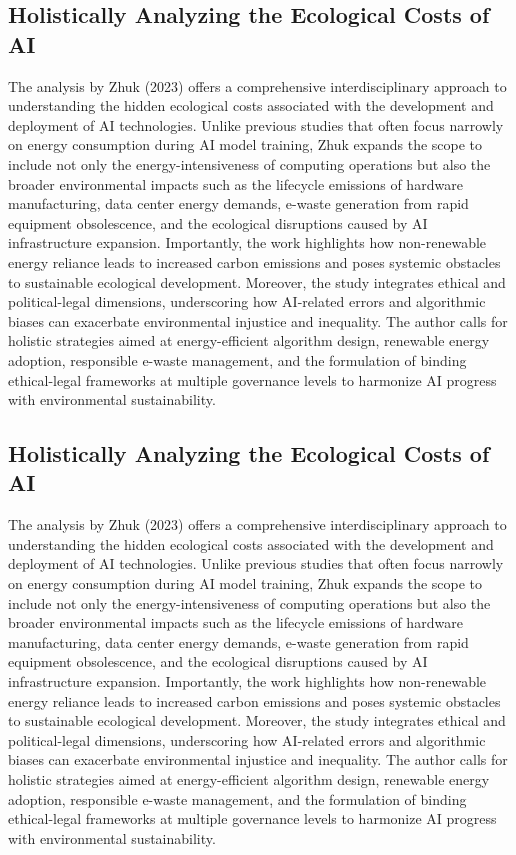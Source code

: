 \documentclass[a4paper, 12pt]{article}
\begin{document}
\subsection{Holistically Analyzing the Ecological Costs of AI}
\hspace{24pt}The analysis by Zhuk (2023) offers a comprehensive interdisciplinary approach to understanding the hidden ecological costs associated with the development and deployment of AI technologies. Unlike previous studies that often focus narrowly on energy consumption during AI model training, Zhuk expands the scope to include not only the energy-intensiveness of computing operations but also the broader environmental impacts such as the lifecycle emissions of hardware manufacturing, data center energy demands, e-waste generation from rapid equipment obsolescence, and the ecological disruptions caused by AI infrastructure expansion. Importantly, the work highlights how non-renewable energy reliance leads to increased carbon emissions and poses systemic obstacles to sustainable ecological development. Moreover, the study integrates ethical and political-legal dimensions, underscoring how AI-related errors and algorithmic biases can exacerbate environmental injustice and inequality. The author calls for holistic strategies aimed at energy-efficient algorithm design, renewable energy adoption, responsible e-waste management, and the formulation of binding ethical-legal frameworks at multiple governance levels to harmonize AI progress with environmental sustainability.

\subsection{Holistically Analyzing the Ecological Costs of AI}

\hspace{24pt}The analysis by Zhuk (2023) offers a comprehensive interdisciplinary approach to understanding the hidden ecological costs associated with the development and deployment of AI technologies. Unlike previous studies that often focus narrowly on energy consumption during AI model training, Zhuk expands the scope to include not only the energy-intensiveness of computing operations but also the broader environmental impacts such as the lifecycle emissions of hardware manufacturing, data center energy demands, e-waste generation from rapid equipment obsolescence, and the ecological disruptions caused by AI infrastructure expansion. Importantly, the work highlights how non-renewable energy reliance leads to increased carbon emissions and poses systemic obstacles to sustainable ecological development. Moreover, the study integrates ethical and political-legal dimensions, underscoring how AI-related errors and algorithmic biases can exacerbate environmental injustice and inequality. The author calls for holistic strategies aimed at energy-efficient algorithm design, renewable energy adoption, responsible e-waste management, and the formulation of binding ethical-legal frameworks at multiple governance levels to harmonize AI progress with environmental sustainability.
\end{document}
